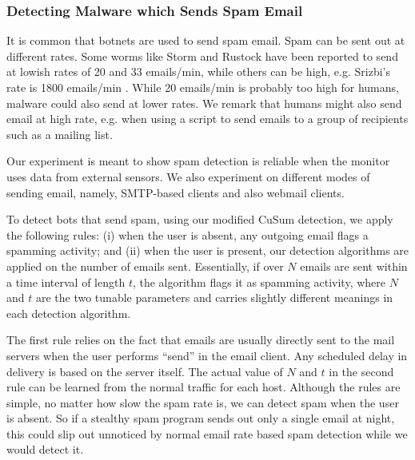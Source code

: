 \subsubsection{Detecting Malware which Sends Spam Email} \label{subsec:spam}

It is common that botnets are used to send spam email.
Spam can be sent out at different rates.
Some worms like Storm and Rustock have been reported to send at lowish
rates of 20 and 33 emails/min, while others can be high, e.g. Srizbi's rate is
1800 emails/min \cite{botlab}. While 20 emails/min is probably too
high for humans, malware could also send at lower rates.
We remark that humans might also send email at high rate, e.g.
when using a script to send emails to a group of recipients such 
as a mailing list.

Our experiment is meant to show
spam detection is reliable when the monitor uses
data from external sensors.
We also experiment on
different modes of sending email, namely,
SMTP-based clients and also webmail clients.


To detect bots that send spam, using our modified CuSum detection, we apply the following rules: (i) when
the user is absent, any outgoing email flags a spamming activity; and
(ii) when the user is present, our detection algorithms are applied on the
number of emails sent. Essentially, if over $N$ emails are sent
within a time interval of length $t$, the algorithm flags it as
spamming activity, where $N$ and $t$ are the two tunable parameters and carries slightly different meanings in each detection algorithm.

The first rule relies on the fact that emails are usually directly
sent to the mail servers when the user performs ``send''
in the email client. Any scheduled
delay in delivery is based on the server itself. The actual value of
$N$ and $t$ in the second rule can be learned from the normal
traffic for each host.
Although the rules are simple, no matter how slow the spam rate
is, we can detect spam when the user is absent. So if a
stealthy spam program sends out only a single email at night,
this could slip out unnoticed by normal email rate based spam detection
while we would detect it.

